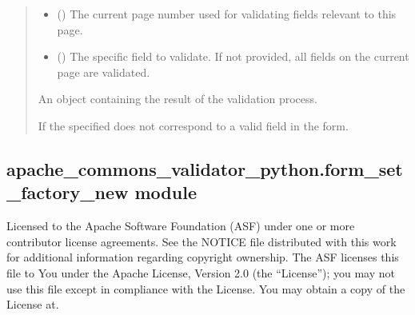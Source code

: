 \documentclass[letterpaper,10pt,english]{sphinxmanual}
\begin{document}
\begin{fulllineitems}
\begin{fulllineitems}
\begin{quote}
\begin{description}
\begin{itemize}
\item {} 
\sphinxAtStartPar
{} () \textendash{} The current page number used for validating fields relevant to this page.

\item {} 
\sphinxAtStartPar
{} (\sphinxstyleliteralemphasis{\sphinxupquote{, }}) \textendash{} The specific field to validate. If not provided, all fields
on the current page are validated.

\end{itemize}

\sphinxAtStartPar
An object containing the result of the validation process.

\sphinxAtStartPar
{\hyperref[\detokenize{apache_commons_validator_python:apache_commons_validator_python.validator_results_new.ValidatorResults}]{}}

\sphinxAtStartPar
{\hyperref[\detokenize{apache_commons_validator_python:apache_commons_validator_python.validator_exception_new.ValidatorException}]{}} \textendash{} If the specified  does not correspond to a valid field
    in the form.

\end{description}\end{quote}

\end{fulllineitems}


\end{fulllineitems}



\subsection{apache\_commons\_validator\_python.form\_set\_factory\_new module}
\label{\detokenize{apache_commons_validator_python:module-apache_commons_validator_python.form_set_factory_new}}\label{\detokenize{apache_commons_validator_python:apache-commons-validator-python-form-set-factory-new-module}}
\sphinxAtStartPar
Licensed to the Apache Software Foundation (ASF) under one or more contributor
license agreements.  See the NOTICE file distributed with this work for additional
information regarding copyright ownership. The ASF licenses this file to You under the
Apache License, Version 2.0 (the “License”); you may not use this file except in
compliance with the License.  You may obtain a copy of the License at.
\end{document}
